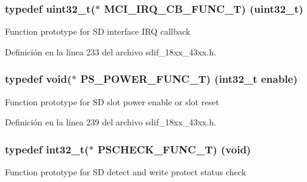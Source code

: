 \subsubsection[{\texorpdfstring{M\+C\+I\+\_\+\+I\+R\+Q\+\_\+\+C\+B\+\_\+\+F\+U\+N\+C\+\_\+T}{MCI_IRQ_CB_FUNC_T}}]{\setlength{\rightskip}{0pt plus 5cm}typedef uint32\+\_\+t($\ast$ M\+C\+I\+\_\+\+I\+R\+Q\+\_\+\+C\+B\+\_\+\+F\+U\+N\+C\+\_\+T) (uint32\+\_\+t)}\hypertarget{group___s_d_i_f__18_x_x__43_x_x_ga5f35531a919c15d7f2015bb06c7c268c}{}\label{group___s_d_i_f__18_x_x__43_x_x_ga5f35531a919c15d7f2015bb06c7c268c}
Function prototype for SD interface I\+RQ callback 

Definición en la línea 233 del archivo sdif\+\_\+18xx\+\_\+43xx.\+h.

\subsubsection[{\texorpdfstring{P\+S\+\_\+\+P\+O\+W\+E\+R\+\_\+\+F\+U\+N\+C\+\_\+T}{PS_POWER_FUNC_T}}]{\setlength{\rightskip}{0pt plus 5cm}typedef void($\ast$ P\+S\+\_\+\+P\+O\+W\+E\+R\+\_\+\+F\+U\+N\+C\+\_\+T) (int32\+\_\+t enable)}\hypertarget{group___s_d_i_f__18_x_x__43_x_x_ga9f9a94c5b4812b8fdc5aa4a808e9ceaf}{}\label{group___s_d_i_f__18_x_x__43_x_x_ga9f9a94c5b4812b8fdc5aa4a808e9ceaf}
Function prototype for SD slot power enable or slot reset 

Definición en la línea 239 del archivo sdif\+\_\+18xx\+\_\+43xx.\+h.

\subsubsection[{\texorpdfstring{P\+S\+C\+H\+E\+C\+K\+\_\+\+F\+U\+N\+C\+\_\+T}{PSCHECK_FUNC_T}}]{\setlength{\rightskip}{0pt plus 5cm}typedef int32\+\_\+t($\ast$ P\+S\+C\+H\+E\+C\+K\+\_\+\+F\+U\+N\+C\+\_\+T) (void)}\hypertarget{group___s_d_i_f__18_x_x__43_x_x_ga3a32ffbe111e1b16b9efd08aee03727e}{}\label{group___s_d_i_f__18_x_x__43_x_x_ga3a32ffbe111e1b16b9efd08aee03727e}
Function prototype for SD detect and write protect status check 

